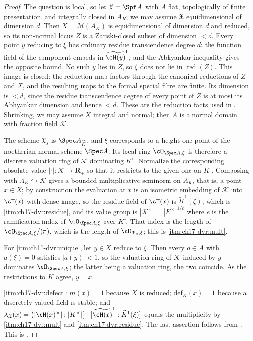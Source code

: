 \begin{proof}
The question is local, so let $\mathfrak X=\Spf A$ with $A$ flat,
topologically of finite presentation, and integrally closed in $A_K$; we
may assume $\mathfrak X$ equidimensional of dimension $d$.  Then
$X=\mathcal M(A_K)$ is equidimensional of dimension $d$ and reduced, so
its non-normal locus $Z$ is a Zariski-closed subset of dimension $<d$.
Every point $y$ reducing to $\xi$ has ordinary residue transcendence
degree $d$: the function field of the component embeds in
$\widetilde{\cH(y)}^1$, and the Abhyankar inequality gives the opposite
bound.  No such $y$ lies in $Z$, so $\xi$ does not lie in
$\operatorname{red}(Z)$.  This image is closed: the reduction map
factors through the canonical reductions of $Z$ and $X$, and the
resulting maps to the formal special fibre are finite.  Its dimension is
$<d$, since the residue transcendence degree of every point of $Z$
is at most its Abhyankar dimension and hence $<d$.  These are the
reduction facts used in \cite[Proposition~18.5.8]{CLD25}.
Shrinking, we may assume $X$ integral and normal; then $A$ is a normal
domain with fraction field $\mathcal K$.

The scheme $\mathfrak X_s$ is $\Spec A_{\widetilde K}$, and $\xi$
corresponds to a height-one point of the noetherian normal scheme
$\Spec A$.  Its local ring $\cO_{\Spec A,\xi}$ is therefore a discrete
valuation ring of $\mathcal K$ dominating $K^\circ$.  Normalize the
corresponding absolute value $|\cdot|:\mathcal K\to\mathbf R_+$ so that it
restricts to the given one on $K^\circ$.  Composing with
$A_K\hookrightarrow\mathcal K$ gives a bounded multiplicative seminorm on
$A_K$, that is, a point $x\in X$; by construction the evaluation at
$x$ is an isometric embedding of $\mathcal K$ into $\cH(x)$ with dense
image, so the residue field of $\cH(x)$ is $\widetilde K^1(\xi)$, which
is \cref{itm:ch17-dvr:residue}, and its value group is
$|\mathcal K^\times|=|K^\times|^{1/e}$ where $e$ is the ramification
index of $\cO_{\Spec A,\xi}$ over $K^\circ$.  That index is the length
of $\cO_{\Spec A,\xi}/(\pi)$, which is the length of
$\cO_{\mathfrak X_s,\xi}$; this is \cref{itm:ch17-dvr:mult}.

For \cref{itm:ch17-dvr:unique}, let $y\in X$ reduce to $\xi$.  Then every
$a\in A$ with $a(\xi)=0$ satisfies $|a(y)|<1$, so the valuation ring
of $\mathcal K$ induced by $y$ dominates $\cO_{\Spec A,\xi}$; the
latter being a valuation ring, the two coincide.  As the restrictions to
$K$ agree, $y=x$.

\cref{itm:ch17-dvr:defect}: $m(x)=1$ because $X$ is reduced;
$\mathrm{def}_K(x)=1$ because a discretely valued field is stable;
and
$\lambda_{\mathfrak X}(x)
 =\bigl(|\cH(x)^\times|:|K^\times|\bigr)\cdot
  [\widetilde{\cH(x)}^1:\widetilde K^1(\xi)]$
equals the multiplicity by \cref{itm:ch17-dvr:mult} and
\cref{itm:ch17-dvr:residue}.  The last assertion follows from
.  This is \cite[Proposition~18.5.8]{CLD25}.
\end{proof}

